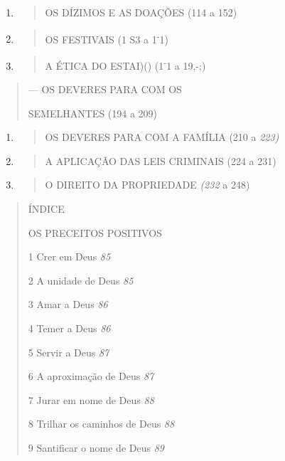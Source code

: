 \begin{enumerate}
\def\labelenumi{\arabic{enumi}.}
\setcounter{enumi}{3}
\item
  \begin{quote}
  OS DÍZIMOS E AS DOAÇÕES (114 a 152)
  \end{quote}
\item
  \begin{quote}
  OS FESTIVAIS (1 S3 a 1\textsuperscript{-}1)
  \end{quote}
\item
  \begin{quote}
  A ÉTICA DO ESTAI)() (1\textsuperscript{-}1 a 19,-;)
  \end{quote}
\end{enumerate}

\begin{quote}
--- OS DEVERES PARA COM OS

SEMELHANTES (194 a 209)
\end{quote}

\begin{enumerate}
\def\labelenumi{\arabic{enumi}.}
\setcounter{enumi}{7}
\item
  \begin{quote}
  OS DEVERES PARA COM A FAMÍLIA (210 a \emph{223)}
  \end{quote}
\item
  \begin{quote}
  A APLICAÇÃO DAS LEIS CRIMINAIS (224 a 231)
  \end{quote}
\item
  \begin{quote}
  O DIREITO DA PROPRIEDADE \emph{(232} a 248)
  \end{quote}
\end{enumerate}

\begin{quote}
ÍNDICE

OS PRECEITOS POSITIVOS

1 Crer em Deus \emph{85}

2 A unidade de Deus \emph{85}

3 Amar a Deus \emph{86}

4 Temer a Deus \emph{86}

5 Servir a Deus \emph{87}

6 A aproximação de Deus \emph{87}

7 Jurar em nome de Deus \emph{88}

8 Trilhar os caminhos de Deus \emph{88}

9 Santificar o nome de Deus \emph{89}
\end{quote}

